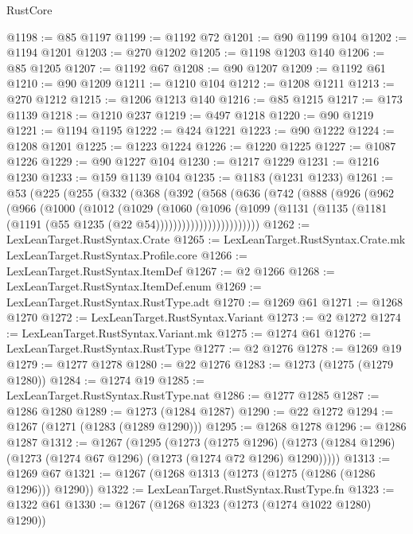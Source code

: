 \begin{lexlean}{RustCore}
\begin{coremodule}
@1198 := @85 @1197
@1199 := @1192 @72
@1201 := @90 @1199 @104
@1202 := @1194 @1201
@1203 := @270 @1202
@1205 := @1198 @1203 @140
@1206 := @85 @1205
@1207 := @1192 @67
@1208 := @90 @1207
@1209 := @1192 @61
@1210 := @90 @1209
@1211 := @1210 @104
@1212 := @1208 @1211
@1213 := @270 @1212
@1215 := @1206 @1213 @140
@1216 := @85 @1215
@1217 := @173 @1139
@1218 := @1210 @237
@1219 := @497 @1218
@1220 := @90 @1219
@1221 := @1194 @1195
@1222 := @424 @1221
@1223 := @90 @1222
@1224 := @1208 @1201
@1225 := @1223 @1224
@1226 := @1220 @1225
@1227 := @1087 @1226
@1229 := @90 @1227 @104
@1230 := @1217 @1229
@1231 := @1216 @1230
@1233 := @159 @1139 @104
@1235 := @1183 (@1231 @1233)
@1261 := @53
    (@225
      (@255
        (@332
          (@368
            (@392
              (@568
                (@636
                  (@742
                    (@888
                      (@926
                        (@962
                          (@966
                            (@1000
                              (@1012
                                (@1029
                                  (@1060
                                    (@1096
                                      (@1099
                                        (@1131
                                          (@1135
                                            (@1181
                                              (@1191 (@55 @1235 (@22 @54))))))))))))))))))))))))
@1262 := LexLeanTarget.RustSyntax.Crate
@1265 := LexLeanTarget.RustSyntax.Crate.mk LexLeanTarget.RustSyntax.Profile.core
@1266 := LexLeanTarget.RustSyntax.ItemDef
@1267 := @2 @1266
@1268 := LexLeanTarget.RustSyntax.ItemDef.enum
@1269 := LexLeanTarget.RustSyntax.RustType.adt
@1270 := @1269 @61
@1271 := @1268 @1270
@1272 := LexLeanTarget.RustSyntax.Variant
@1273 := @2 @1272
@1274 := LexLeanTarget.RustSyntax.Variant.mk
@1275 := @1274 @61
@1276 := LexLeanTarget.RustSyntax.RustType
@1277 := @2 @1276
@1278 := @1269 @19
@1279 := @1277 @1278
@1280 := @22 @1276
@1283 := @1273 (@1275 (@1279 @1280))
@1284 := @1274 @19
@1285 := LexLeanTarget.RustSyntax.RustType.nat
@1286 := @1277 @1285
@1287 := @1286 @1280
@1289 := @1273 (@1284 @1287)
@1290 := @22 @1272
@1294 := @1267 (@1271 (@1283 (@1289 @1290)))
@1295 := @1268 @1278
@1296 := @1286 @1287
@1312 := @1267
    (@1295
      (@1273
        (@1275 @1296)
        (@1273 (@1284 @1296) (@1273 (@1274 @67 @1296) (@1273 (@1274 @72 @1296) @1290)))))
@1313 := @1269 @67
@1321 := @1267 (@1268 @1313 (@1273 (@1275 (@1286 (@1286 @1296))) @1290))
@1322 := LexLeanTarget.RustSyntax.RustType.fn
@1323 := @1322 @61
@1330 := @1267 (@1268 @1323 (@1273 (@1274 @1022 @1280) @1290))

\end{coremodule}
\end{lexlean}
